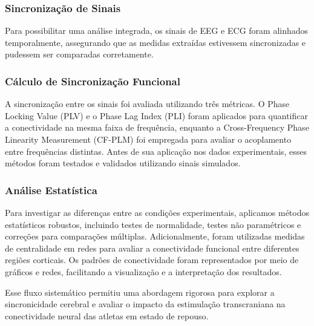 \subsubsection{Sincronização de Sinais}
Para possibilitar uma análise integrada, os sinais de EEG e ECG foram alinhados temporalmente, assegurando que as medidas extraídas estivessem sincronizadas e pudessem ser comparadas corretamente.

\subsubsection{Cálculo de Sincronização Funcional}
A sincronização entre os sinais foi avaliada utilizando três métricas. O Phase Locking Value (PLV) e o Phase Lag Index (PLI) foram aplicados para quantificar a conectividade na mesma faixa de frequência, enquanto a Cross-Frequency Phase Linearity Measurement (CF-PLM) foi empregada para avaliar o acoplamento entre frequências distintas. Antes de sua aplicação nos dados experimentais, esses métodos foram testados e validados utilizando sinais simulados.

\subsubsection{Análise Estatística} Para investigar as diferenças entre as condições experimentais, aplicamos métodos estatísticos robustos, incluindo testes de normalidade, testes não paramétricos e correções para comparações múltiplas. Adicionalmente, foram utilizadas medidas de centralidade em redes para avaliar a conectividade funcional entre diferentes regiões corticais. Os padrões de conectividade foram representados por meio de gráficos e redes, facilitando a visualização e a interpretação dos resultados.

Esse fluxo sistemático permitiu uma abordagem rigorosa para explorar a sincronicidade cerebral e avaliar o impacto da estimulação transcraniana na conectividade neural das atletas em estado de repouso.
